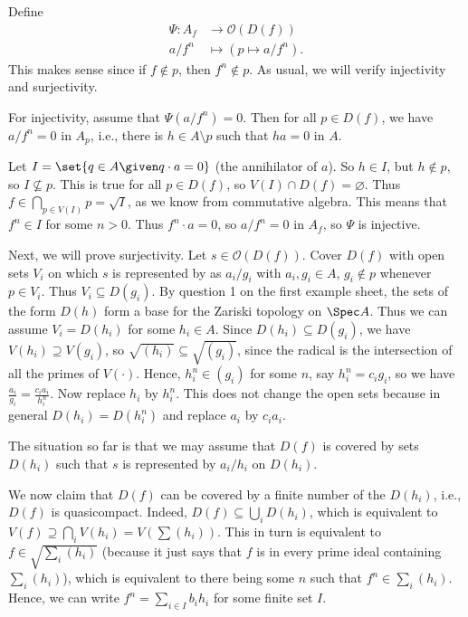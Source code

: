 Define
\begin{align*}
	\Psi\colon A_f&\to \mathcal{O}(D(f))\\
	a/f^n&\mapsto (p\mapsto a/f^n).
\end{align*}
This makes sense since if $f\notin p$, then $f^n\notin p$.
As usual, we will verify injectivity and surjectivity.

For injectivity, assume that $\Psi(a/f^n) = 0$. Then for all $p \in D(f)$, we have
$a/f^n = 0$ in $A_p$, i.e., there is  $h \in A\setminus p$ such that $ha = 0$ in $A$.

Let $I = \set{q \in A\given q\cdot a = 0}$ (the annihilator of $a$).
So $h \in I$, but $h \notin p$, so $I\nsubseteq p$.
This is true for all $p \in D(f)$, so $V(I)\cap D(f) = \varnothing$. Thus
$f \in \bigcap_{p \in V(I)}p = \sqrt{I}$, as we know from commutative algebra.
This means that $f^n \in I$ for some $n>0$. Thus $f^n\cdot a = 0$, so
$a/f^n = 0$ in $A_f$, so $\Psi$ is injective.

Next, we will prove surjectivity. Let $s \in \mathcal{O}(D(f))$. Cover
$D(f)$ with open sets $V_i$ on which $s$ is represented by as $a_i/g_i$ with
$a_i, g_i \in A$, $g_i \notin p$ whenever $p \in V_i$. Thus $V_i \subseteq D(g_i)$.
By question 1 on the first example sheet, the sets of the form $D(h)$ form a
base for the Zariski topology on $\Spec A$. Thus we can assume $V_i = D(h_i)$
for some $h_i \in A$. Since $D(h_i) \subseteq D(g_i)$, we have
$V(h_i) \supseteq V(g_i)$, so $\sqrt{(h_i)} \subseteq \sqrt{(g_i)}$, since the
radical is the intersection of all the primes of $V(\cdot)$. Hence,
$h_i^n \in (g_i)$ for some $n$, say $h_i^n = c_ig_i$, so we have
$\frac{a_i}{g_i} = \frac{c_ia_i}{h_i^n}$. Now replace $h_i$ by $h_i^n$. This does
not change the open sets because in general $D(h_i) = D(h_i^n)$ and replace
$a_i$ by $c_ia_i$.

The situation so far is that we may assume that $D(f)$ is covered by sets
$D(h_i)$ such that $s$ is represented by $a_i/h_i$ on $D(h_i)$.

We now claim that $D(f)$ can be covered by a finite number of the  $D(h_i)$, i.e.,
$D(f)$ is quasicompact. Indeed, $D(f) \subseteq \bigcup_i D(h_i)$, which is equivalent
to $V(f) \supseteq \bigcap_i V(h_i) = V(\sum (h_i))$. This in turn is equivalent to
$f \in \sqrt{\sum_i (h_i)}$ (because it just says that $f$ is in every prime ideal
containing $\sum_i (h_i)$), which is equivalent to there being some $n$ such that
$f^n \in \sum_i (h_i)$. Hence, we can write $f^n = \sum_{i \in I} b_i h_i$ for some finite
set $I$.

